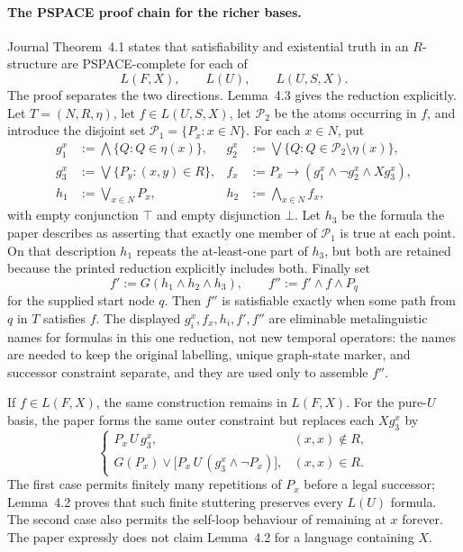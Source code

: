 \paragraph{The PSPACE proof chain for the richer bases.}
Journal Theorem~4.1 states that satisfiability and existential truth in an
\(R\)-structure are PSPACE-complete for each of
\[
 L(F,X),\qquad L(U),\qquad L(U,S,X).
\]
The proof separates the two directions.  Lemma~4.3 gives the reduction
explicitly.  Let \(T=(N,R,\eta)\), let \(f\in L(U,S,X)\), let
\(\mathcal P_2\) be the atoms occurring in \(f\), and introduce the disjoint
set \(\mathcal P_1=\{P_x:x\in N\}\).  For each \(x\in N\), put
\[
\begin{aligned}
 g_1^x&:=\bigwedge\{Q:Q\in\eta(x)\},&
 g_2^x&:=\bigvee\{Q:Q\in\mathcal P_2\setminus\eta(x)\},\\
 g_3^x&:=\bigvee\{P_y:(x,y)\in R\},&
 f_x&:=P_x\to(g_1^x\land\neg g_2^x\land Xg_3^x),\\
 h_1&:=\bigvee_{x\in N}P_x,&
 h_2&:=\bigwedge_{x\in N}f_x,
\end{aligned}
\]
with empty conjunction \(\top\) and empty disjunction \(\bot\).  Let \(h_3\)
be the formula the paper describes as asserting that exactly one member of
\(\mathcal P_1\) is true at each point.  On that description \(h_1\) repeats
the at-least-one part of \(h_3\), but both are retained because the printed
reduction explicitly includes both.  Finally set
\[
 f':=G(h_1\land h_2\land h_3),
 \qquad
 f'':=f'\land f\land P_q
\]
for the supplied start node \(q\).  Then \(f''\) is satisfiable exactly when
some path from \(q\) in \(T\) satisfies \(f\).  The displayed
\(g_i^x,f_x,h_i,f',f''\) are eliminable metalinguistic names for formulas in
this one reduction, not new temporal operators: the names are needed to keep
the original labelling, unique graph-state marker, and successor constraint
separate, and they are used only to assemble \(f''\).

If \(f\in L(F,X)\), the same construction remains in \(L(F,X)\).  For the
pure-\(U\) basis, the paper forms the same outer constraint but replaces each
\(Xg_3^x\) by
\[
 \begin{cases}
  P_x\,U\,g_3^x,
    &(x,x)\notin R,\\
  G(P_x)\lor\bigl[P_x\,U\,(g_3^x\land\neg P_x)\bigr],
    &(x,x)\in R.
 \end{cases}
\]
The first case permits finitely many repetitions of \(P_x\) before a legal
successor; Lemma~4.2 proves that such finite stuttering preserves every
\(L(U)\) formula.  The second case also permits the self-loop behaviour of
remaining at \(x\) forever.  The paper expressly does not claim Lemma~4.2 for
a language containing \(X\).

